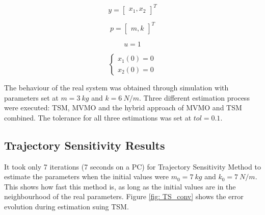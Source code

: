 \begin{equation}
	y = \begin{bmatrix}
		x_{1}, x_{2}
	\end{bmatrix}^ {T}
	\label{eq: SMoutput}
\end{equation}

\begin{equation}
	p = \begin{bmatrix}
		m, k
	\end{bmatrix}^ {T}
	\label{eq: SMp}
\end{equation}

\begin{equation}
	u = 1
	\label{eq: SMinput}
\end{equation}

\begin{equation}
	\begin{cases}
		x_{1}(0) = 0 \\
		x_{2}(0) = 0
	\end{cases}
	\label{eq: SMinitcond}
\end{equation}

The behaviour of the real system was obtained through simulation with parameters set at $m = 3\ kg$ and $k = 6\ N/m$. Three different estimation process were executed: TSM, MVMO and the hybrid approach of MVMO and TSM combined. The tolerance for all three estimations was set at $tol = 0.1$.

\subsection{Trajectory Sensitivity Results}

It took only 7 iterations (7 seconds on a PC) for Trajectory Sensitivity Method to estimate the parameters when the initial values were $m_{0} = 7\ kg$ and $k_{0} = 7\ N/m$. This shows how fast this method is, as long as the initial values are in the neighbourhood of the real parameters. Figure \ref{fig: TS_conv} shows the error evolution during estimation suing TSM.

